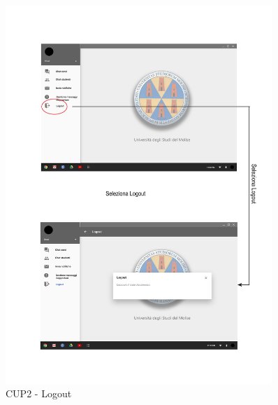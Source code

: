 \begin{figure}
	\centering
	\includegraphics[width=0.9\textwidth]{imgs/gruppo6/activities/act_cup2_logout.pdf}
	\caption{CUP2 - Logout}
	\label{fig:cup2}
\end{figure}

